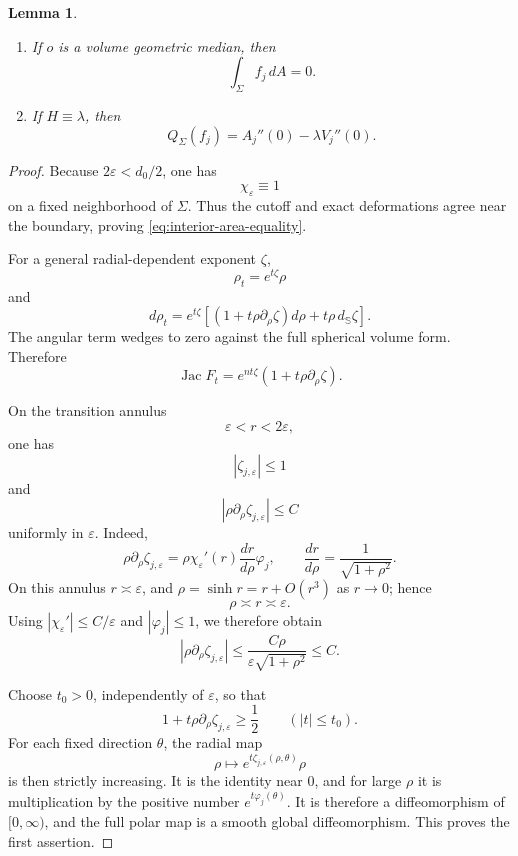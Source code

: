 \documentclass[11pt,reqno]{amsart}
\numberwithin{equation}{section}
\newtheorem{lemma}[theorem]{Lemma}
\theoremstyle{definition}
\theoremstyle{remark}
\newcommand{\Jac}{\operatorname{Jac}}
\newcommand{\eps}{\varepsilon}
\begin{document}
\begin{lemma}
\begin{enumerate}[label=\textup{(\roman*)}]
\item
If \(o\) is a volume geometric median, then
\begin{equation}
\int_\Sigma f_j\,dA=0.
\label{eq:interior-zero-mean}
\end{equation}

\item
If \(H\equiv\lambda\), then
\begin{equation}
Q_\Sigma(f_j)
=
A_j''(0)-\lambda V_j''(0).
\label{eq:interior-Hessian-identification}
\end{equation}

\end{enumerate}
\end{lemma}

\begin{proof}
Because \(2\eps<d_0/2\), one has
\[
\chi_\eps\equiv1
\]
on a fixed neighborhood of \(\Sigma\). Thus the cutoff and exact
deformations agree near the boundary, proving
\eqref{eq:interior-area-equality}.

For a general radial-dependent exponent \(\zeta\),
\[
\rho_t=e^{t\zeta}\rho
\]
and
\[
d\rho_t
=
e^{t\zeta}
\left[
(1+t\rho\partial_\rho\zeta)d\rho
+
t\rho\,d_{\mathbb S}\zeta
\right].
\]
The angular term wedges to zero against the full spherical volume form.
Therefore
\begin{equation}
\Jac F_t
=
e^{nt\zeta}
(1+t\rho\partial_\rho\zeta).
\label{eq:general-ambient-Jacobian}
\end{equation}

On the transition annulus
\[
\eps<r<2\eps,
\]
one has
\[
|\zeta_{j,\eps}|\le1
\]
and
\[
|\rho\partial_\rho\zeta_{j,\eps}|
\le C
\]
uniformly in \(\eps\). Indeed,
\[
\rho\partial_\rho\zeta_{j,\eps}
=
\rho\chi_\eps'(r)\frac{dr}{d\rho}\varphi_j,
\qquad
\frac{dr}{d\rho}
=
\frac{1}{\sqrt{1+\rho^2}}.
\]
On this annulus \(r\asymp\eps\), and
\(\rho=\sinh r=r+O(r^3)\) as \(r\to0\); hence
\[
\rho\asymp r\asymp\eps.
\]
Using \(|\chi_\eps'|\le C/\eps\) and
\(|\varphi_j|\le1\), we therefore obtain
\[
|\rho\partial_\rho\zeta_{j,\eps}|
\le
\frac{C\rho}{\eps\sqrt{1+\rho^2}}
\le C.
\]

Choose \(t_0>0\), independently of \(\eps\), so that
\[
1+t\rho\partial_\rho\zeta_{j,\eps}\ge\frac{1}{2}
\qquad (|t|\le t_0).
\]
For each fixed direction \(\theta\), the radial map
\[
\rho\longmapsto e^{t\zeta_{j,\eps}(\rho,\theta)}\rho
\]
is then strictly increasing. It is the identity near \(0\), and for large
\(\rho\) it is multiplication by the positive number
\(e^{t\varphi_j(\theta)}\). It is therefore a diffeomorphism of
\([0,\infty)\), and the full polar map is a smooth global diffeomorphism.
This proves the first assertion.


\end{proof}
\end{document}
